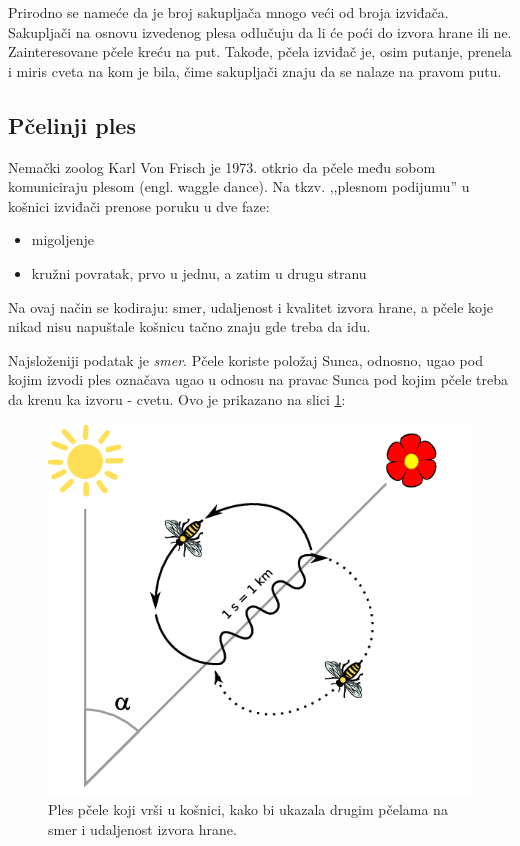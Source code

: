 \documentclass[a4paper]{article}
\begin{document}
{Prirodno se nameće da je broj sakupljača mnogo veći od broja izviđača. Sakupljači na osnovu izvedenog plesa odlučuju da li će poći do izvora hrane ili ne. Zainteresovane pčele kreću na put. Takođe, pčela izviđač je, osim putanje, prenela i miris cveta na kom je bila, čime sakupljači znaju da se nalaze na pravom putu.

\subsection{Pčelinji ples}
\label{subsec:pcelinji ples}

	Nemački zoolog Karl Von Frisch je 1973. otkrio da pčele među sobom komuniciraju plesom (engl. waggle dance). Na tkzv. ,,plesnom podijumu'' u košnici izviđači prenose poruku u dve faze:
\begin{itemize}%
\setlength{\labelsep}{10pt}
	\item migoljenje
	\item kružni povratak, prvo u jednu, a zatim u drugu stranu
\end{itemize}
Na ovaj način se kodiraju: smer, udaljenost i kvalitet izvora hrane, a pčele koje nikad nisu napuštale košnicu tačno znaju gde treba da idu.

Najsloženiji podatak je {\em smer}. Pčele koriste položaj Sunca, odnosno, ugao pod kojim izvodi ples označava ugao u odnosu na pravac Sunca pod kojim pčele treba da krenu ka izvoru - cvetu. Ovo je prikazano na slici \ref{fig:pcela2}:

\begin{figure}[h!]
\begin{center}
\includegraphics[scale=0.45]{waggle_dance.png}
\end{center}
\caption{Ples pčele koji vrši u košnici, kako bi ukazala drugim pčelama na smer i udaljenost izvora hrane.}
\label{fig:pcela2}
\end{figure}

}
\end{document}
